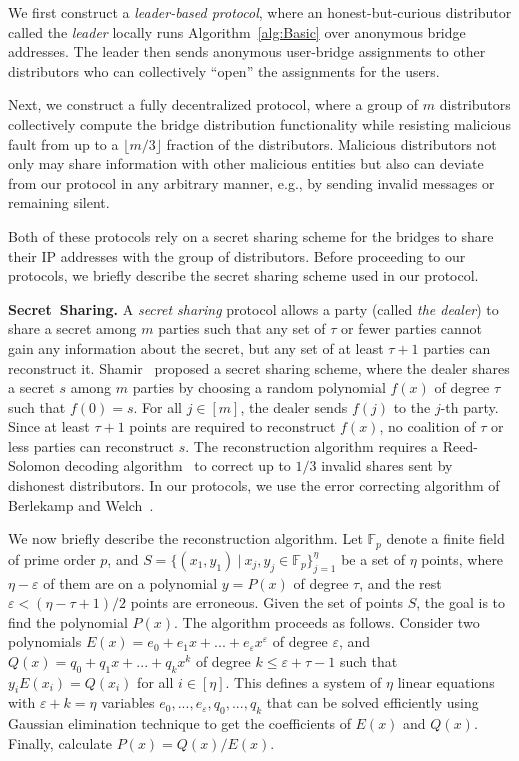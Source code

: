 \documentclass[letterpaper,twocolumn,10pt]{article}
\newcommand{\fullpaper}[1]{#1}
\newcommand{\fullpaper}[1]{}
\newcommand{\eg}{e.g.}
\newcommand{\sfsize}{\fontsize{0.73\baselineskip}{0.73\baselineskip}\selectfont}
\newcommand{\sans}[1]{\textsf{\sfsize \mbox{#1}}}
\newcommand{\sansb}[1]{\textbf{\sans{\mbox{#1}}}}
\newcommand{\para}[1]{\vspace{0.55em} \noindent \sansb{{\mbox{#1}}}}
\begin{document}
We first construct a \emph{leader-based protocol}, where an honest-but-curious distributor called the \emph{leader} locally runs Algorithm~\ref{alg:Basic} over anonymous bridge addresses. The leader then sends anonymous user-bridge assignments to other distributors who can collectively ``open'' the assignments for the users. 

Next, we construct a fully decentralized protocol, where a group of $m$ distributors collectively compute the bridge distribution functionality while resisting malicious fault from up to a $\lfloor m/3 \rfloor$ fraction of the distributors. Malicious distributors not only may share information with other malicious entities but also can deviate from our protocol in any arbitrary manner, \eg, by sending invalid messages or remaining silent.

Both of these protocols rely on a secret sharing scheme for the bridges to share their IP addresses with the group of distributors. Before proceeding to our protocols, we briefly describe the secret sharing scheme used in our protocol.

\para{Secret Sharing.} A \emph{secret sharing} protocol allows a party (called \emph{the dealer}) to share a secret among $m$ parties such that any set of $\tau$ or fewer parties cannot gain any information about the secret, but any set of at least $\tau+1$ parties can reconstruct it. Shamir~\cite{shamir:how} proposed a secret sharing scheme, where the dealer shares a secret $s$ among $m$ parties by choosing a random polynomial $f(x)$ of degree $\tau$ such that ${f(0)=s}$. For all ${j \in [m]}$, the dealer sends $f(j)$ to the $j$-th party. Since at least ${\tau+1}$ points are required to reconstruct $f(x)$, no coalition of $\tau$ or less parties can reconstruct $s$.
The reconstruction algorithm requires a Reed-Solomon decoding algorithm~\cite{Reed-Solomon1960} to correct up to $1/3$ invalid shares sent by dishonest distributors. In our protocols, we use the error correcting algorithm of Berlekamp and Welch~\cite{Berlekamp:Welch:1986}.

\fullpaper{We now briefly describe the reconstruction algorithm. Let $\mathbb{F}_{p}$ denote a finite field of prime order $p$, and $S=\{(x_{1},y_{1})\:|\:x_{j},y_{j}\in\mathbb{F}_{p}\}_{j=1}^{\eta}$ be a set of $\eta$ points, where $\eta-\varepsilon$ of them are on a polynomial $y=P(x)$ of degree $\tau$, and the rest $\varepsilon<(\eta-\tau+1)/2$ points are erroneous. Given the set of points $S$, the goal is to find the polynomial $P(x)$. The algorithm proceeds as follows. Consider two polynomials $E(x)=e_{0}+e_{1}x+...+e_{\varepsilon}x^{\varepsilon}$ of degree $\varepsilon$, and $Q(x)=q_{0}+q_{1}x+...+q_{k}x^{k}$ of degree $k\leq\varepsilon+\tau-1$ such that $y_{i}E(x_{i})=Q(x_{i})$ for all $i\in[\eta]$. This defines a system of $\eta$ linear equations with $\varepsilon+k=\eta$ variables $e_{0},...,e_{\varepsilon},q_{0},...,q_{k}$ that can be solved efficiently using Gaussian elimination technique to get the coefficients of $E(x)$ and $Q(x)$. Finally, calculate $P(x)=Q(x)/E(x)$.}
\end{document}
